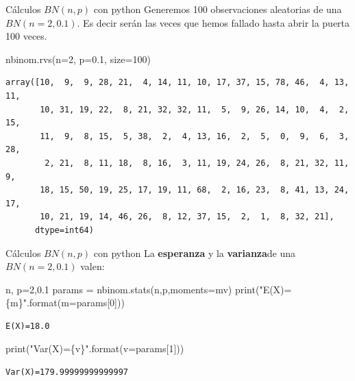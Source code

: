 \documentclass[
  ignorenonframetext,
  aspectratio=169]{beamer}
\newenvironment{Shaded}{\begin{snugshade}}{\end{snugshade}}
\newcommand{\BuiltInTok}[1]{\textcolor[rgb]{0.00,0.23,0.31}{#1}}
\newcommand{\DecValTok}[1]{\textcolor[rgb]{0.68,0.00,0.00}{#1}}
\newcommand{\FloatTok}[1]{\textcolor[rgb]{0.68,0.00,0.00}{#1}}
\newcommand{\NormalTok}[1]{\textcolor[rgb]{0.00,0.23,0.31}{#1}}
\newcommand{\OperatorTok}[1]{\textcolor[rgb]{0.37,0.37,0.37}{#1}}
\newcommand{\SpecialCharTok}[1]{\textcolor[rgb]{0.37,0.37,0.37}{#1}}
\newcommand{\StringTok}[1]{\textcolor[rgb]{0.13,0.47,0.30}{#1}}
\begin{document}
\begin{frame}[fragile]{Cálculos \(BN(n,p)\) con python}
\protect\hypertarget{cuxe1lculos-bnnp-con-python-1}{}
Generemos 100 observaciones aleatorias de una \(BN(n=2,0.1)\). Es decir
serán las veces que hemos fallado hasta abrir la puerta 100 veces.

\begin{Shaded}
\begin{Highlighting}[]
\NormalTok{nbinom.rvs(n}\OperatorTok{=}\DecValTok{2}\NormalTok{, p}\OperatorTok{=}\FloatTok{0.1}\NormalTok{, size}\OperatorTok{=}\DecValTok{100}\NormalTok{)}
\end{Highlighting}
\end{Shaded}

\begin{verbatim}
array([10,  9,  9, 28, 21,  4, 14, 11, 10, 17, 37, 15, 78, 46,  4, 13, 11,
       10, 31, 19, 22,  8, 21, 32, 32, 11,  5,  9, 26, 14, 10,  4,  2, 15,
       11,  9,  8, 15,  5, 38,  2,  4, 13, 16,  2,  5,  0,  9,  6,  3, 28,
        2, 21,  8, 11, 18,  8, 16,  3, 11, 19, 24, 26,  8, 21, 32, 11,  9,
       18, 15, 50, 19, 25, 17, 19, 11, 68,  2, 16, 23,  8, 41, 13, 24, 17,
       10, 21, 19, 14, 46, 26,  8, 12, 37, 15,  2,  1,  8, 32, 21],
      dtype=int64)
\end{verbatim}
\end{frame}

\begin{frame}[fragile]{Cálculos \(BN(n,p)\) con python}
\protect\hypertarget{cuxe1lculos-bnnp-con-python-2}{}
La \textbf{esperanza} y la \textbf{varianza}de una \(BN(n=2,0.1)\)
valen:

\begin{Shaded}
\begin{Highlighting}[]
\NormalTok{n, p}\OperatorTok{=}\DecValTok{2}\NormalTok{,}\FloatTok{0.1}
\NormalTok{params }\OperatorTok{=}\NormalTok{ nbinom.stats(n,p,moments}\OperatorTok{=}\StringTok{\textquotesingle{}mv\textquotesingle{}}\NormalTok{)}
\BuiltInTok{print}\NormalTok{(}\StringTok{"E(X)=}\SpecialCharTok{\{m\}}\StringTok{"}\NormalTok{.}\BuiltInTok{format}\NormalTok{(m}\OperatorTok{=}\NormalTok{params[}\DecValTok{0}\NormalTok{]))}
\end{Highlighting}
\end{Shaded}

\begin{verbatim}
E(X)=18.0
\end{verbatim}

\begin{Shaded}
\begin{Highlighting}[]
\BuiltInTok{print}\NormalTok{(}\StringTok{"Var(X)=}\SpecialCharTok{\{v\}}\StringTok{"}\NormalTok{.}\BuiltInTok{format}\NormalTok{(v}\OperatorTok{=}\NormalTok{params[}\DecValTok{1}\NormalTok{]))}
\end{Highlighting}
\end{Shaded}

\begin{verbatim}
Var(X)=179.99999999999997
\end{verbatim}
\end{frame}
\end{document}
